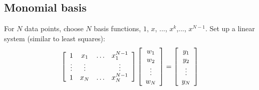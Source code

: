 \documentclass[12pt,letterpaper,noanswers]{exam}
\begin{document}
\subsection*{Monomial basis}
\begin{tcolorbox}
For $N$ data points, choose $N$ basis functions, $1$, $x$, ..., $x^k$,..., $x^{N-1}$.
Set up a linear system (similar to least squares):
\[\left[\begin{array}{c c c c}
1 & x_1 & \hdots & x_1^{N-1} \\
\vdots & \vdots & & \vdots \\
1 & x_N & \hdots & x_N^{N-1}
\end{array}\right]
\left[\begin{array}{c}
w_1 \\
w_2 \\
\vdots \\
w_N
\end{array}\right] = 
\left[\begin{array}{c}
y_1 \\
y_2 \\
\vdots \\
y_N
\end{array}\right]\]
\end{tcolorbox}
\end{document}
